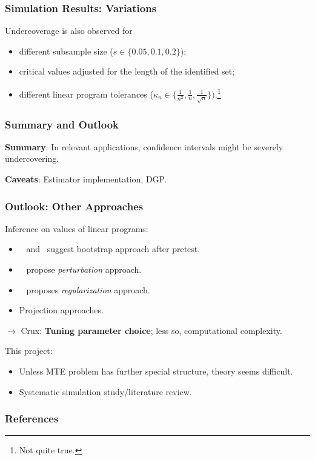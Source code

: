 \documentclass[11pt, aspectratio=169]{beamer}
\begin{document}
\begin{frame}
    \frametitle{Simulation Results: Variations}
    Undercoverage is also observed for
    \begin{itemize}
        \item different subsample size ($s\in\{0.05, 0.1, 0.2\}$);
        \item critical values adjusted for the length of the identified set;
        \item different linear program tolerances ($\kappa_n \in \{\frac{1}{n^2}, \frac{1}{n}, \frac{1}{\sqrt{n}}\})$.\footnote{
            Not quite true.
        }
    \end{itemize}

\end{frame}

\begin{frame}
    \frametitle{Summary and Outlook}

    \textbf{Summary}: In relevant applications, confidence intervals might be severely undercovering.

    \vspace{0.5cm}

    \textbf{Caveats}: Estimator implementation, DGP\@.

\end{frame}

\begin{frame}
    \frametitle{Outlook: Other Approaches}
    Inference on values of linear programs:
    \begin{itemize}
        \item~\citet{bhattacharya2009inferring} and~\citet{freyberger2015identification} suggest bootstrap approach after pretest.
        \item~\citet{cho2024simple} propose \textit{perturbation} approach.
        \item~\citet{gafarov2024simple} proposes \textit{regularization} approach.
        \item Projection approaches.
    \end{itemize}
    $\rightarrow$ Crux: \textbf{Tuning parameter choice}; less so, computational complexity.

    \vspace{0.5cm}
    This project:
    \begin{itemize}
        \item Unless MTE problem has further special structure, theory seems difficult.
        \item Systematic simulation study/literature review.
    \end{itemize}

\end{frame}


\begin{frame}[allowframebreaks]
    \frametitle{References}
    \renewcommand{\bibfont}{\normalfont\footnotesize}
    \printbibliography
\end{frame}
\end{document}
